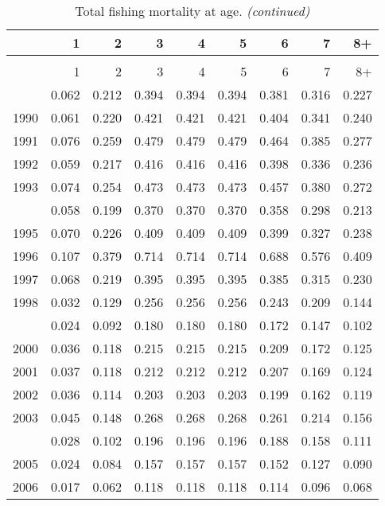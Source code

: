 \documentclass[
]{article}
\begin{document}
\begin{longtable}[t]{lrrrrrrrr}
\caption{\label{tab:FAA-tot-table}Total fishing mortality at age.}\\
\toprule
  & 1 & 2 & 3 & 4 & 5 & 6 & 7 & 8+\\
\midrule
\endfirsthead
\caption[]{Total fishing mortality at age. \textit{(continued)}}\\
\toprule
  & 1 & 2 & 3 & 4 & 5 & 6 & 7 & 8+\\
\midrule
\endhead

\endfoot
\bottomrule
\endlastfoot
1989 & 0.062 & 0.212 & 0.394 & 0.394 & 0.394 & 0.381 & 0.316 & 0.227\\
1990 & 0.061 & 0.220 & 0.421 & 0.421 & 0.421 & 0.404 & 0.341 & 0.240\\
1991 & 0.076 & 0.259 & 0.479 & 0.479 & 0.479 & 0.464 & 0.385 & 0.277\\
1992 & 0.059 & 0.217 & 0.416 & 0.416 & 0.416 & 0.398 & 0.336 & 0.236\\
1993 & 0.074 & 0.254 & 0.473 & 0.473 & 0.473 & 0.457 & 0.380 & 0.272\\
\addlinespace
1994 & 0.058 & 0.199 & 0.370 & 0.370 & 0.370 & 0.358 & 0.298 & 0.213\\
1995 & 0.070 & 0.226 & 0.409 & 0.409 & 0.409 & 0.399 & 0.327 & 0.238\\
1996 & 0.107 & 0.379 & 0.714 & 0.714 & 0.714 & 0.688 & 0.576 & 0.409\\
1997 & 0.068 & 0.219 & 0.395 & 0.395 & 0.395 & 0.385 & 0.315 & 0.230\\
1998 & 0.032 & 0.129 & 0.256 & 0.256 & 0.256 & 0.243 & 0.209 & 0.144\\
\addlinespace
1999 & 0.024 & 0.092 & 0.180 & 0.180 & 0.180 & 0.172 & 0.147 & 0.102\\
2000 & 0.036 & 0.118 & 0.215 & 0.215 & 0.215 & 0.209 & 0.172 & 0.125\\
2001 & 0.037 & 0.118 & 0.212 & 0.212 & 0.212 & 0.207 & 0.169 & 0.124\\
2002 & 0.036 & 0.114 & 0.203 & 0.203 & 0.203 & 0.199 & 0.162 & 0.119\\
2003 & 0.045 & 0.148 & 0.268 & 0.268 & 0.268 & 0.261 & 0.214 & 0.156\\
\addlinespace
2004 & 0.028 & 0.102 & 0.196 & 0.196 & 0.196 & 0.188 & 0.158 & 0.111\\
2005 & 0.024 & 0.084 & 0.157 & 0.157 & 0.157 & 0.152 & 0.127 & 0.090\\
2006 & 0.017 & 0.062 & 0.118 & 0.118 & 0.118 & 0.114 & 0.096 & 0.068\\

\end{longtable}
\end{document}
